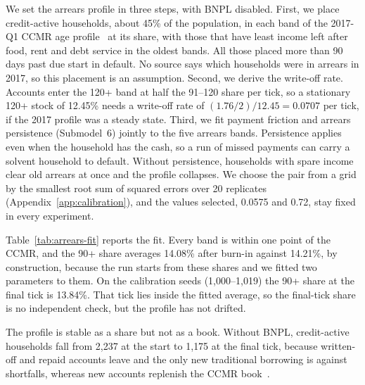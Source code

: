 We set the arrears profile in three steps, with \ac{BNPL} disabled. First, we place credit-active
households, about 45\% of the population, in each band of the 2017-Q1 \ac{CCMR} age
profile~\citep{ncr_ccmr_2017} at its share, with those that have least income left after food,
rent and debt service in the oldest bands. All those placed more than 90 days past due start in
default. No source says which households were in arrears in 2017, so this placement is an
assumption. Second, we derive the write-off rate. Accounts enter the 120+ band
at half the 91--120 share per tick, so a stationary 120+ stock of 12.45\% needs a write-off rate
of $(1.76/2)/12.45 = 0.0707$ per tick, if the 2017 profile was a steady state. Third, we fit
payment friction and arrears persistence (Submodel~6) jointly to the five arrears bands.
Persistence applies even when the household has the cash, so a run of missed payments can carry
a solvent household to default. Without persistence, households with spare income clear old
arrears at once and the profile collapses. We choose the pair from a grid by the smallest root
sum of squared errors over 20 replicates (Appendix~\ref{app:calibration}), and the values
selected, 0.0575 and 0.72, stay fixed in every experiment.

Table~\ref{tab:arrears-fit} reports the fit. Every band is within one point of the \ac{CCMR},
and the 90+ share averages 14.08\% after burn-in against 14.21\%, by construction, because the
run starts from these shares and we fitted two parameters to them. On the calibration seeds
(1{,}000--1{,}019) the 90+ share at the final tick is 13.84\%. That tick lies inside the fitted
average, so the final-tick share is no independent check, but the profile has not drifted.

The profile is stable as a share but not as a book. Without \ac{BNPL}, credit-active households
fall from 2{,}237 at the start to 1{,}175 at the final tick, because written-off and repaid
accounts leave and the only new traditional borrowing is against shortfalls, whereas new
accounts replenish the \ac{CCMR} book~\citep{ncr_ccmr_2017}.

